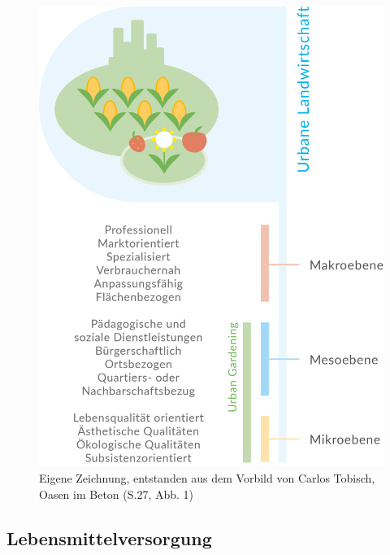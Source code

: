\documentclass{scrartcl}
\begin{document}
\begin{figure}[htbp]
\centering
\includegraphics[width=12cm]{image_folder/SchaubildULvsUG.png}
\caption{Eigene Zeichnung, entstanden aus dem Vorbild von Carlos Tobisch, Oasen im Beton (S.27, Abb. 1)}
\label{fig:ul_typologie}
\end{figure}

\subsection{Lebensmittelversorgung}
\end{document}
